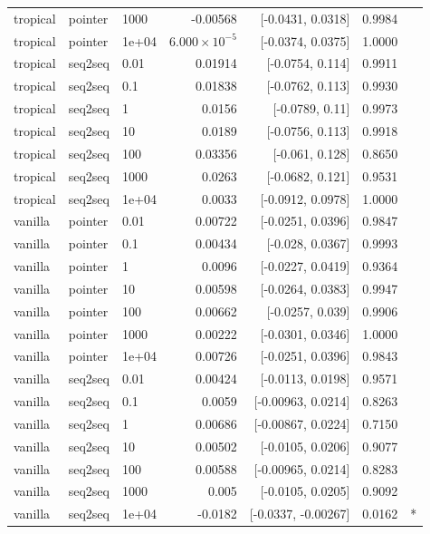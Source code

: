 \documentclass[10pt]{article}
\begin{document}
{\begin{longtable}{lllrrrl}
tropical & pointer & 1000 & -0.00568 & [-0.0431, 0.0318] & 0.9984 & \\
tropical & pointer & 1e+04 & $6.000\times10^{-5}$ & [-0.0374, 0.0375] & 1.0000 & \\
tropical & seq2seq & 0.01 & 0.01914 & [-0.0754, 0.114] & 0.9911 & \\
tropical & seq2seq & 0.1 & 0.01838 & [-0.0762, 0.113] & 0.9930 & \\
tropical & seq2seq & 1 & 0.0156 & [-0.0789, 0.11] & 0.9973 & \\
tropical & seq2seq & 10 & 0.0189 & [-0.0756, 0.113] & 0.9918 & \\
tropical & seq2seq & 100 & 0.03356 & [-0.061, 0.128] & 0.8650 & \\
tropical & seq2seq & 1000 & 0.0263 & [-0.0682, 0.121] & 0.9531 & \\
tropical & seq2seq & 1e+04 & 0.0033 & [-0.0912, 0.0978] & 1.0000 & \\
vanilla & pointer & 0.01 & 0.00722 & [-0.0251, 0.0396] & 0.9847 & \\
vanilla & pointer & 0.1 & 0.00434 & [-0.028, 0.0367] & 0.9993 & \\
vanilla & pointer & 1 & 0.0096 & [-0.0227, 0.0419] & 0.9364 & \\
vanilla & pointer & 10 & 0.00598 & [-0.0264, 0.0383] & 0.9947 & \\
vanilla & pointer & 100 & 0.00662 & [-0.0257, 0.039] & 0.9906 & \\
vanilla & pointer & 1000 & 0.00222 & [-0.0301, 0.0346] & 1.0000 & \\
vanilla & pointer & 1e+04 & 0.00726 & [-0.0251, 0.0396] & 0.9843 & \\
vanilla & seq2seq & 0.01 & 0.00424 & [-0.0113, 0.0198] & 0.9571 & \\
vanilla & seq2seq & 0.1 & 0.0059 & [-0.00963, 0.0214] & 0.8263 & \\
vanilla & seq2seq & 1 & 0.00686 & [-0.00867, 0.0224] & 0.7150 & \\
vanilla & seq2seq & 10 & 0.00502 & [-0.0105, 0.0206] & 0.9077 & \\
vanilla & seq2seq & 100 & 0.00588 & [-0.00965, 0.0214] & 0.8283 & \\
vanilla & seq2seq & 1000 & 0.005 & [-0.0105, 0.0205] & 0.9092 & \\
vanilla & seq2seq & 1e+04 & -0.0182 & [-0.0337, -0.00267] & 0.0162 & *\\
\bottomrule
\end{longtable}
}
\end{document}
